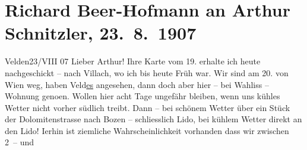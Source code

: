 

         
         \renewcommand{\erwaehntePersonen}{Personen: Hermann Beer, Richard Beer-Hofmann, Paul Goldmann, Fedor Mamroth, Olga Schnitzler}
         \renewcommand{\erwaehnteOrte}{Orte: Bozen, Etablissement Ernst Wahliss, Große Dolomitenstraße, Lido, Velden am Wörthersee, Veldes, Villach, Welsberg-Taisten, Wien}
         \renewcommand{\erwaehnteWerke}{}
               \section[Richard Beer-Hofmann an Arthur Schnitzler, 23. 8. 1907]{ Richard Beer-Hofmann an Arthur Schnitzler, 23. 8. 1907}\nopagebreak{}\rehead{ }\begin{ledgroupsized}[t]{13cm}\normalsize\beginnumbering \toendnotes[C]{\smallbreak\pagebreak[2]} 
\toendnotes[C]{\smallbreak}\pstart
           \raggedleft{}{\pb}Velden23/VIII 07\pend
           \pstart
           Lieber Arthur! Ihre Karte vom 19. erhalte ich heute
               nachgeschickt – nach Villach, wo ich bis heute
               Früh war. Wir sind am 20. von Wien
               weg, haben Veld\uline{es} angesehen, dann doch aber hier – bei Wahliss – Wohnung geno{\geminationm}en. Wollen hier acht
               Tage ungefähr bleiben, wenn uns kühles Wetter nicht vorher südlich treibt. Dann – bei
               schönem Wetter über ein Stück der Dolomitenstrasse nach {\pb}Bozen – schliesslich Lido, bei kühlem Wetter direkt an den Lido! I{\geminationm}erhin ist ziemliche
               Wahrscheinlichkeit vorhanden dass wir zwischen 2 – und

\end{ledgroupsized}

